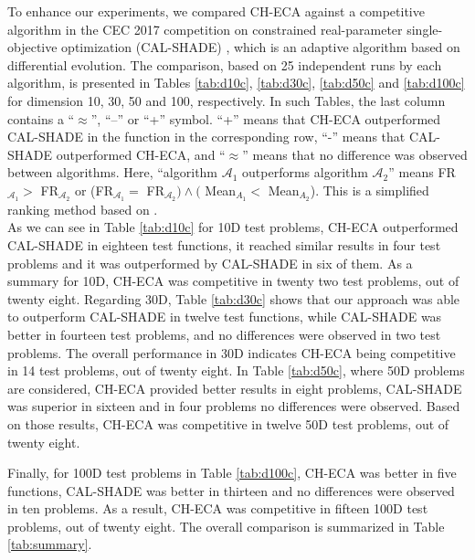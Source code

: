 \documentclass[conference]{IEEEtran}
\begin{document}
To enhance our experiments, we compared CH-ECA against a  competitive algorithm 
in the CEC 2017 competition on constrained real-parameter single-objective 
optimization (CAL-SHADE) \cite{zamuda2017adaptive}, which is an adaptive algorithm 
based on differential evolution. The comparison, based on 25 independent runs by 
each algorithm, is presented in Tables \ref{tab:d10c}, \ref{tab:d30c}, \ref{tab:d50c} 
and \ref{tab:d100c} for dimension 10, 30, 50 and 100, respectively. In such Tables, 
the last column contains a ``$\approx$'', ``--'' or ``+'' symbol. ``+'' means that 
CH-ECA outperformed CAL-SHADE in the function  	in the corresponding row, ``-'' 
means that CAL-SHADE outperformed CH-ECA, and  ``$\approx$'' means that no difference 
was observed between algorithms. Here, ``algorithm $\mathcal{A}_1$ outperforms 
algorithm $\mathcal{A}_2$'' means FR$_{\mathcal{A}_1} > $ FR$_{\mathcal{A}_2}$ 
or (FR$_{\mathcal{A}_1} = $ FR$_{\mathcal{A}_2}) \wedge ($ Mean$_{A_1} < $ Mean$_{A_2}$). 
This is a simplified ranking method based on \cite{cecCop17}. \\

As we can see in Table \ref{tab:d10c} for 10D test problems, CH-ECA outperformed 
CAL-SHADE in eighteen test functions, it reached similar results in four test 
problems and it was outperformed by CAL-SHADE in six of them. As a summary for 
10D, CH-ECA was competitive in twenty two test problems, out of twenty eight. %
%
Regarding 30D, Table \ref{tab:d30c} shows that our approach was able to outperform 
CAL-SHADE in twelve test functions, while CAL-SHADE was better in fourteen test 
problems, and no differences were observed in two test problems. The overall 
performance in 30D indicates CH-ECA being competitive in 14 test problems, out 
of twenty eight. 
%
In Table \ref{tab:d50c}, where 50D problems are considered, CH-ECA provided better 
results in eight problems, CAL-SHADE was superior in sixteen and in four problems 
no differences were observed. Based on those results, CH-ECA was competitive in 
twelve 50D test problems, out of twenty eight. 

Finally, for 100D test problems in Table \ref{tab:d100c}, CH-ECA was better in 
five functions, CAL-SHADE was better in thirteen and no differences were observed 
in ten problems. As a result, CH-ECA was competitive in fifteen 100D test problems, 
out of twenty eight. The overall comparison is summarized in Table \ref{tab:summary}.
\end{document}
